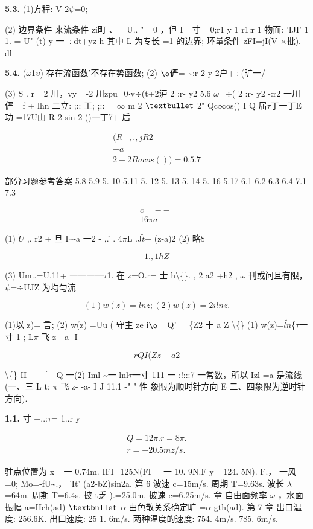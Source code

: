\noindent\textbf{5.3.} (1)方程: V 2$\psi$=0;

(2) 边界条件 来流条件 zi町 、 =U.. " =0 ，但 I =寸 =0;r1 y 1 r1:r 1 物面: 'IJI' 1 1. = U" (t) y 一 $\div$dt+yz h 其中 L 为专长 =1 的边界; 环量条件 zFI=jI(V $\times $批). dl

\noindent\textbf{5.4.} ($\omega$1$\upsilon$) 存在流函数'不存在势函数; (2) ${\rm ø}$俨= \textasciitilde{}:r 2 y 2户+$\div$(旷一/

(3) S . r =2 川，vy =-2 川zpu=0$\cdot $v$\div$(t+2沪 2 :r- y2 5.6 $\omega$=$\div$( 2 :r- y2 -:r2 一川 俨= f + lhn 二立: ;:: 工; ;:: = $\infty$ m 2 ${\rm •}$ 2" Qc$\infty$os() I Q 届$\tau$丁一丁E 功 =17U山 R 2 sin 2 ()一丁7+ 后

\begin{gather*}
(R- ,.,j R 2\\
+a\\
2 -2Racos()) =0. 5. 7
\end{gather*}

部分习题参考答案 5.8 5.9 5. 10 5.11 5. 12 5. 13 5. 14 5. 16 5.17 6.1 6.2 6.3 6.4 7.1 7.3

\begin{gather*}
c=--~\\
16\pi a
\end{gather*}

(1) $\tilde{U}$ ,. r2 + 旦 I\textasciitilde{}-a 一2 - ,.' . 4$\pi$L .J$\tilde{t}$+ (z-a)2 (2) 略\$

\[1. , 1 h Z  \]

(3) Um..=U.11+ 一一一一$\tau$1. 在 z=O.r= 士 h\textbackslash\{\}. , 2 a2 +h2 , $\omega$ 刊或问且有限， $\psi$=$\div$UJZ 为均匀流

\[(1) w(z)=lnz; (2) w(z)=2ilnz.\]

(1)以 z)= 言; (2) w(z) =Uu ( 守主 ze i${\rm ø}$ \_Q'\_\_\{Z2 十 a Z \textbackslash\{\} (1) w(z)=$\tilde{ln}$\{$\tau$一寸 1 ; L$\pi$ 飞 z- -a- I

\[r Q I (Zz +a 2\]

\textbackslash\{\} II \_ \_[\_ Q 一(2) Iml \textasciitilde{}一 lnl$\tau$一寸 111 一 :!:::7 一常数，所以 Izl =a 是流线(一、三 L t; $\pi$ 飞 z- -a- I J 11.1 -" " 性 象限为顺时针方向 E 二、四象限为逆时针方向).

\noindent\textbf{1.1.} 寸 +..:$\tau$= 1..r y

\begin{gather*}
Q=12 \pi .r=8\pi .\\
r=-20.5m z/s.
\end{gather*}

驻点位置为 x= 一 0.74m. IFI=125N(FI = 一 10. 9N.F y =124. 5N). F.， 一风 =0; Mo=-fU\textasciitilde{}.， 'It' (a2-bZ)sin2a. 第 6 波速 c=15m/s. 周期 T=9.63s. 波长 $\lambda$=64m. 周期 T=6.4s. 披 t乏 ).=25.0m. 披速 c=6.25m/s. 章 自由面频率 $\omega$ ，水面振幅 a=Hch(ad) ${\rm •}$ $\alpha$ 由色散关系确定旷 =$\alpha$ gth(ad). 第 7 章 出口温度: 256.6K. 出口速度: 25 1. 6m/s. 两种温度的速度: 754. 4m/s. 785. 6m/s.

